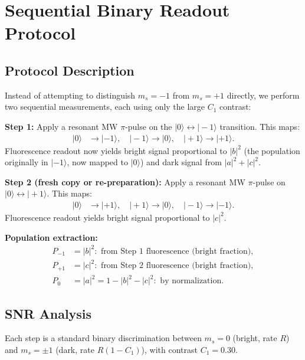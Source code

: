 \documentclass[11pt,letterpaper]{article}
\begin{document}
\section{Sequential Binary Readout Protocol}
\label{sec:sequential}

\subsection{Protocol Description}

Instead of attempting to distinguish $m_s = -1$ from $m_s = +1$ directly,
we perform two sequential measurements, each using only the large $C_1$
contrast:

\textbf{Step 1:} Apply a resonant MW $\pi$-pulse on the $|0\rangle \leftrightarrow |-1\rangle$ transition.  This maps:
\begin{align}
  |0\rangle &\to |-1\rangle, \quad |-1\rangle \to |0\rangle, \quad |+1\rangle \to |+1\rangle.
\end{align}
Fluorescence readout now yields bright signal proportional to $|b|^2$ (the
population originally in $|-1\rangle$, now mapped to $|0\rangle$) and dark
signal from $|a|^2 + |c|^2$.

\textbf{Step 2 (fresh copy or re-preparation):} Apply a resonant MW $\pi$-pulse
on $|0\rangle \leftrightarrow |+1\rangle$.  This maps:
\begin{align}
  |0\rangle &\to |+1\rangle, \quad |+1\rangle \to |0\rangle, \quad |-1\rangle \to |-1\rangle.
\end{align}
Fluorescence readout yields bright signal proportional to $|c|^2$.

\textbf{Population extraction:}
\begin{align}
  P_{-1} &= |b|^2: \text{ from Step 1 fluorescence (bright fraction)}, \\
  P_{+1} &= |c|^2: \text{ from Step 2 fluorescence (bright fraction)}, \\
  P_0 &= |a|^2 = 1 - |b|^2 - |c|^2: \text{ by normalization}.
\end{align}

\subsection{SNR Analysis}

Each step is a standard binary discrimination between $m_s = 0$ (bright,
rate $R$) and $m_s = \pm 1$ (dark, rate $R(1-C_1)$), with contrast $C_1 = 0.30$.
\end{document}
